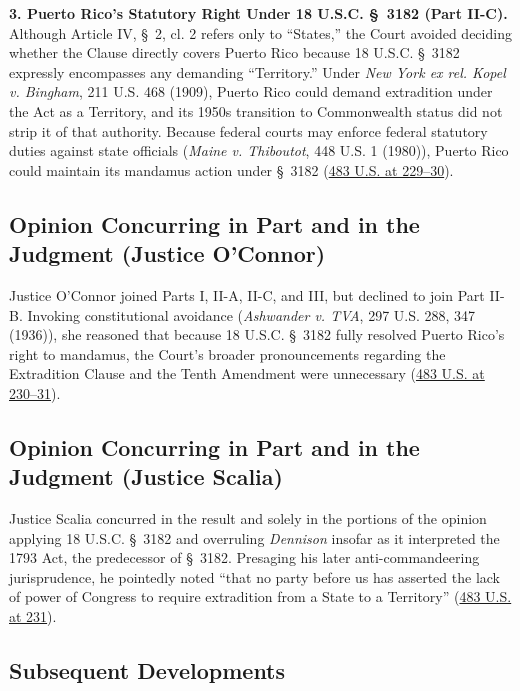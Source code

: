 \documentclass[12pt]{article}
\begin{document}
\textbf{3. Puerto Rico's Statutory Right Under 18 U.S.C. \S~3182 (Part II-C).} Although Article IV, \S~2, cl. 2 refers only to ``States,'' the Court avoided deciding whether the Clause directly covers Puerto Rico because 18 U.S.C. \S~3182 expressly encompasses any demanding ``Territory.'' Under \emph{New York ex rel. Kopel v. Bingham}, 211 U.S. 468 (1909), Puerto Rico could demand extradition under the Act as a Territory, and its 1950s transition to Commonwealth status did not strip it of that authority. Because federal courts may enforce federal statutory duties against state officials (\emph{Maine v. Thiboutot}, 448 U.S. 1 (1980)), Puerto Rico could maintain its mandamus action under \S~3182 (\href{https://supreme.justia.com/cases/federal/us/483/219/}{483 U.S. at 229--30}).

\subsection{Opinion Concurring in Part and in the Judgment (Justice O'Connor)}

Justice O'Connor joined Parts I, II-A, II-C, and III, but declined to join Part II-B. Invoking constitutional avoidance (\emph{Ashwander v. TVA}, 297 U.S. 288, 347 (1936)), she reasoned that because 18 U.S.C. \S~3182 fully resolved Puerto Rico's right to mandamus, the Court's broader pronouncements regarding the Extradition Clause and the Tenth Amendment were unnecessary (\href{https://supreme.justia.com/cases/federal/us/483/219/}{483 U.S. at 230--31}).

\subsection{Opinion Concurring in Part and in the Judgment (Justice Scalia)}

Justice Scalia concurred in the result and solely in the portions of the opinion applying 18 U.S.C. \S~3182 and overruling \emph{Dennison} insofar as it interpreted the 1793 Act, the predecessor of \S~3182. Presaging his later anti-commandeering jurisprudence, he pointedly noted ``that no party before us has asserted the lack of power of Congress to require extradition from a State to a Territory'' (\href{https://supreme.justia.com/cases/federal/us/483/219/}{483 U.S. at 231}).

\subsection{Subsequent Developments}
\end{document}
